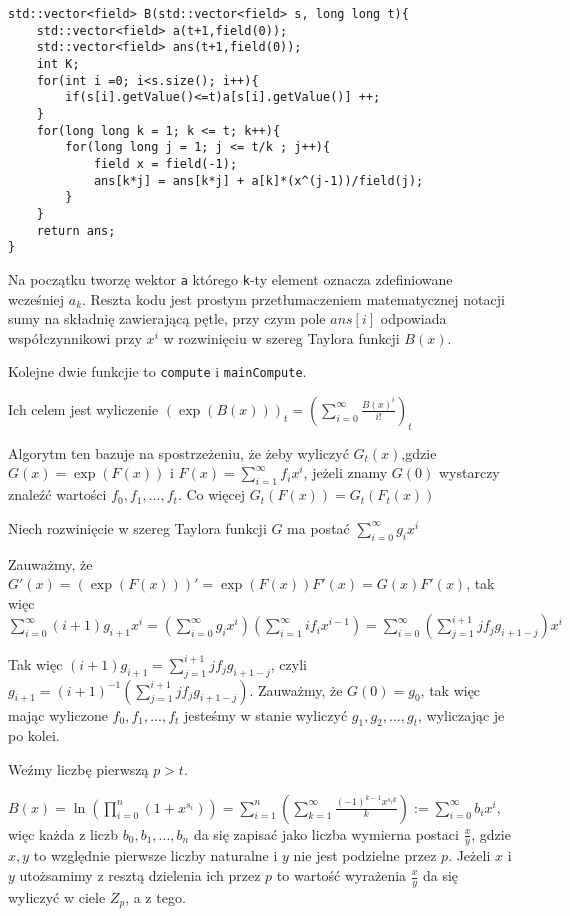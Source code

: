 \documentclass{article}
\begin{document}
\begin{lstlisting}
std::vector<field> B(std::vector<field> s, long long t){
    std::vector<field> a(t+1,field(0));
    std::vector<field> ans(t+1,field(0));
    int K;
    for(int i =0; i<s.size(); i++){
        if(s[i].getValue()<=t)a[s[i].getValue()] ++;
    }
    for(long long k = 1; k <= t; k++){
        for(long long j = 1; j <= t/k ; j++){
            field x = field(-1);
            ans[k*j] = ans[k*j] + a[k]*(x^(j-1))/field(j);
        }
    }
    return ans;
}
\end{lstlisting}

Na początku tworzę wektor \texttt{a} którego \texttt{k}-ty element oznacza zdefiniowane wcześniej $a_k$. 
Reszta kodu jest prostym przetłumaczeniem matematycznej notacji sumy na składnię zawierającą pętle, przy 
czym pole $ans[i]$ odpowiada współczynnikowi przy $x^i$ w rozwinięciu w szereg Taylora funkcji $B(x)$.

Kolejne dwie funkcjie to \texttt{compute} i \texttt{mainCompute}. 



Ich celem jest wyliczenie $(\exp(B(x)))_t=(\sum_{i=0}^\infty \frac{B(x)^i}{i!})_t$

Algorytm ten bazuje na spostrzeżeniu, że żeby wyliczyć $G_t(x)$,gdzie $G(x)=\exp(F(x))$ i $F(x) =\sum_{i=1}^\infty f_ix^i$,
jeżeli znamy $G(0)$ wystarczy znaleźć wartości $f_0,f_1,...,f_t$. Co więcej $G_t(F(x))=G_t(F_t(x))$

Niech rozwinięcie w szereg Taylora funkcji $G$ ma postać $\sum^{\infty}_{i=0}g_ix^i$

Zauważmy, że $G'(x)=(\exp(F(x)))'=\exp(F(x))F'(x)=G(x)F'(x)$, tak więc
$\sum_{i=0}^{\infty}(i+1)g_{i+1}x^{i}=(\sum_{i=0}^{\infty}g_ix^i)(\sum_{i=1}^{\infty}if_{i}x^{i-1})=
\sum_{i=0}^{\infty}(\sum_{j=1}^{i+1}jf_jg_{i+1-j})x^i$

Tak więc $(i+1)g_{i+1}=\sum_{j=1}^{i+1}jf_jg_{i+1-j}$, czyli $g_{i+1}=(i+1)^{-1}(\sum_{j=1}^{i+1}jf_jg_{i+1-j})$.
Zauważmy, że $G(0)=g_0$, tak więc mając wyliczone $f_0,f_1,...,f_t$ jesteśmy w stanie wyliczyć $g_1,g_2,...,g_t$, wyliczając je po kolei.

Weźmy liczbę pierwszą $p>t$.

$B(x)=\ln(\prod_{i=0}^n(1+x^{s_i}))=\sum_{i=1}^{n}(\sum_{k=1}^{\infty}\frac{(-1)^{k-1}x^{s_ik}}{k}):=\sum_{i=0}^{\infty}b_ix^i$, więc każda z liczb $b_0,b_1,...,b_n$ da się zapisać jako liczba wymierna postaci $\frac{x}{y}$, gdzie $x,y$ to
względnie pierwsze liczby naturalne i $y$ nie jest podzielne przez $p$. Jeżeli $x$ i $y$ utożsamimy z resztą dzielenia ich 
przez $p$ to wartość wyrażenia $\frac{x}{y}$ da się wyliczyć w ciele $Z_p$, a z tego.
\end{document}
